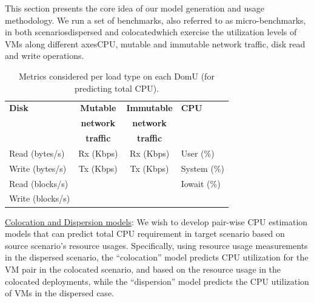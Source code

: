 

This section presents the core idea of our model generation and usage methodology.
We run a set of benchmarks, also referred to as micro-benchmarks, in both 
scenarios\textemdash{}dispersed and colocated\textemdash{}which exercise the utilization 
levels of VMs along different
axes\textemdash{}CPU, mutable and immutable network traffic, disk read and
write operations.


 \begin{table}
 \caption{Metrics considered per load type on each DomU (for predicting total CPU).}
 \begin{center}
 \begin{tabular}{|l|c|c|l|} \hline
  \bf{Disk} & \bf{Mutable} & \bf{Immutable} & \bf{CPU} \\ 
 & \bf{network} & \bf{network} & \\
  & \bf{traffic} & \bf{traffic} & \\ \hline
  Read (bytes/s) & Rx (Kbps) & Rx (Kbps) & User (\%) \\
  Write (bytes/s) & Tx (Kbps) & Tx (Kbps) & System (\%) \\
  Read (blocks/s) &  &  & Iowait (\%) \\
  Write (blocks/s) & &  & \\ \hline
 \end{tabular}
 \label{metrics-table}
 \end{center}
 \end{table}

\underline{Colocation and Dispersion models}: We wish to 
develop pair-wise CPU estimation models
that can predict total CPU requirement in target scenario
based on source scenario's resource usages.
Specifically, using resource usage measurements in the 
dispersed scenario, the ``colocation''
model predicts CPU utilization for the VM pair in the colocated scenario,
and based on the resource usage in the colocated deployments, while 
the ``dispersion''
model predicts the CPU utilization of VMs in the dispersed case.

